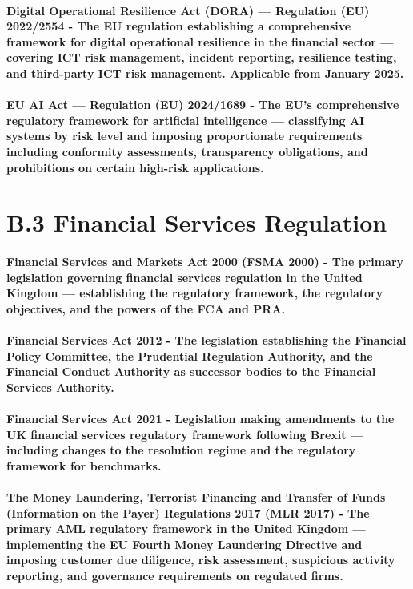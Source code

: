 \paragraph{\textbf{Digital Operational Resilience Act (DORA) — Regulation (EU) 2022/2554} - The EU regulation establishing a comprehensive framework for digital operational resilience in the financial sector — covering ICT risk management, incident reporting, resilience testing, and third-party ICT risk management. Applicable from January 2025.}
\paragraph{\textbf{EU AI Act — Regulation (EU) 2024/1689} - The EU's comprehensive regulatory framework for artificial intelligence — classifying AI systems by risk level and imposing proportionate requirements including conformity assessments, transparency obligations, and prohibitions on certain high-risk applications.}

\section*{B.3 Financial Services Regulation}
\paragraph{\textbf{Financial Services and Markets Act 2000 (FSMA 2000)} - The primary legislation governing financial services regulation in the United Kingdom — establishing the regulatory framework, the regulatory objectives, and the powers of the FCA and PRA.}
\paragraph{\textbf{Financial Services Act 2012} - The legislation establishing the Financial Policy Committee, the Prudential Regulation Authority, and the Financial Conduct Authority as successor bodies to the Financial Services Authority.}
\paragraph{\textbf{Financial Services Act 2021} - Legislation making amendments to the UK financial services regulatory framework following Brexit — including changes to the resolution regime and the regulatory framework for benchmarks.}
\paragraph{\textbf{The Money Laundering, Terrorist Financing and Transfer of Funds (Information on the Payer) Regulations 2017 (MLR 2017)} - The primary AML regulatory framework in the United Kingdom — implementing the EU Fourth Money Laundering Directive and imposing customer due diligence, risk assessment, suspicious activity reporting, and governance requirements on regulated firms.}
